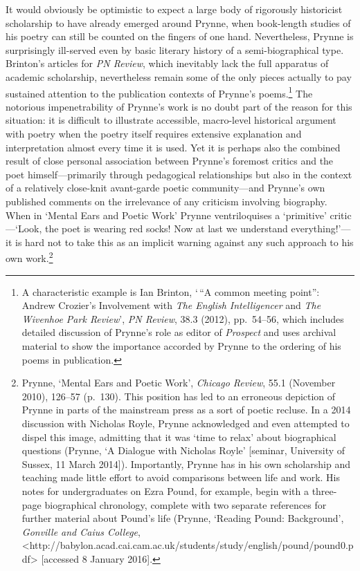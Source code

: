 \documentclass[]{article}
\begin{document}
It would obviously be optimistic to expect a large body of rigorously
historicist scholarship to have already emerged around Prynne, when
book-length studies of his poetry can still be counted on the fingers of
one hand. Nevertheless, Prynne is surprisingly ill-served even by basic
literary history of a semi-biographical type. Brinton's articles for
\emph{PN Review}, which inevitably lack the full apparatus of academic
scholarship, nevertheless remain some of the only pieces actually to pay
sustained attention to the publication contexts of Prynne's
poems.\footnote{A characteristic example is Ian Brinton, `\,``A common
  meeting point'': Andrew Crozier's Involvement with \emph{The English
  Intelligencer} and \emph{The Wivenhoe Park Review}', \emph{PN Review},
  38.3 (2012), pp.~54--56, which includes detailed discussion of
  Prynne's role as editor of \emph{Prospect} and uses archival material
  to show the importance accorded by Prynne to the ordering of his poems
  in publication.} The notorious impenetrability of Prynne's work is no
doubt part of the reason for this situation: it is difficult to
illustrate accessible, macro-level historical argument with poetry when
the poetry itself requires extensive explanation and interpretation
almost every time it is used. Yet it is perhaps also the combined result
of close personal association between Prynne's foremost critics and the
poet himself---primarily through pedagogical relationships but also in
the context of a relatively close-knit avant-garde poetic
community---and Prynne's own published comments on the irrelevance of
any criticism involving biography. When in `Mental Ears and Poetic Work'
Prynne ventriloquises a `primitive' critic---`Look, the poet is wearing
red socks! Now at last we understand everything!'---it is hard not to
take this as an implicit warning against any such approach to his own
work.\footnote{Prynne, `Mental Ears and Poetic Work', \emph{Chicago
  Review}, 55.1 (November 2010), 126--57 (p.~130). This position has led
  to an erroneous depiction of Prynne in parts of the mainstream press
  as a sort of poetic recluse. In a 2014 discussion with Nicholas Royle,
  Prynne acknowledged and even attempted to dispel this image, admitting
  that it was `time to relax' about biographical questions (Prynne, `A
  Dialogue with Nicholas Royle' {[}seminar, University of Sussex, 11
  March 2014{]}). Importantly, Prynne has in his own scholarship and
  teaching made little effort to avoid comparisons between life and
  work. His notes for undergraduates on Ezra Pound, for example, begin
  with a three-page biographical chronology, complete with two separate
  references for further material about Pound's life (Prynne, `Reading
  Pound: Background', \emph{Gonville and Caius College},
  \textless{}http://babylon.acad.cai.cam.ac.uk/students/study/english/pound/pound0.pdf\textgreater{}
  {[}accessed 8 January 2016{]}.}
\end{document}
